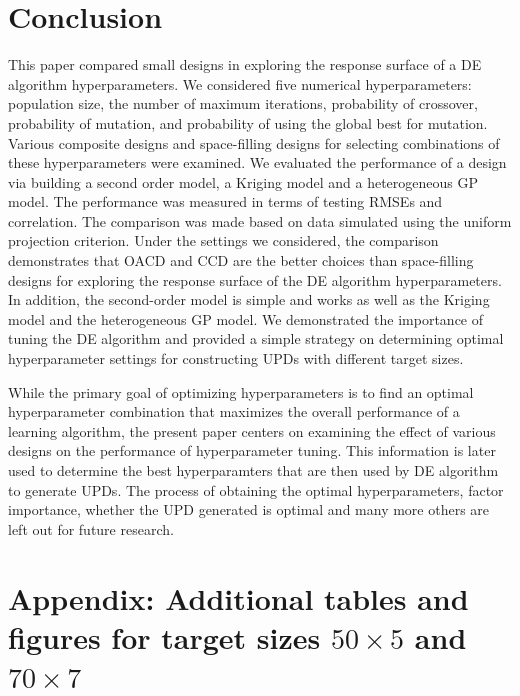 \documentclass [PhD] {package/uclathes}
\begin{document}
\section{Conclusion}
{This paper compared small designs in exploring the response surface of a DE algorithm hyperparameters. We considered five numerical hyperparameters:  population size, the number of maximum  iterations, probability of crossover, probability of mutation, and probability of using the global best for mutation. Various composite designs and space-filling designs for selecting combinations of these hyperparameters were examined. We evaluated the performance of a design via building a second order model, a Kriging model and a heterogeneous GP model. The performance was measured in terms of testing RMSEs and correlation. The comparison was made based on data simulated using the uniform projection criterion. Under the settings we considered, the comparison demonstrates that OACD and CCD are the better choices than space-filling designs for exploring the response surface of the DE algorithm hyperparameters. In addition, the second-order model is simple and works as well as the Kriging model and the heterogeneous GP model. We  demonstrated the importance of tuning the DE algorithm  and provided a simple strategy on determining optimal hyperparameter settings for  constructing UPDs with different target sizes.}

While the primary goal of optimizing hyperparameters is to find an optimal hyperparameter combination that maximizes the overall performance of a learning algorithm, the present paper centers on examining the effect of various designs on the performance of hyperparameter tuning. This information is later used to determine the best hyperparamters that are then used by DE algorithm to generate UPDs. The process of obtaining the optimal hyperparameters, factor importance, whether the UPD generated is optimal and many more others  are left out for future research.


\clearpage
\section*{Appendix: Additional tables and figures for target sizes $50\times5$ and $70\times7$}
\end{document}
